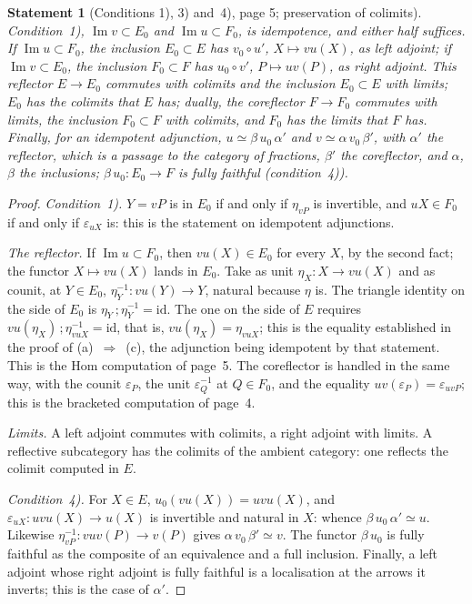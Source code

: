 \documentclass[11pt]{article}
\theoremstyle{plain}
\newtheorem*{enonce}{Statement}
\theoremstyle{definition}
\theoremstyle{remark}
\begin{document}
\begin{enonce}[Conditions 1), 3) and~4), page 5; preservation of colimits]
Condition~1), $\operatorname{Im} v \subset E_0$ and $\operatorname{Im} u \subset F_0$, is idempotence, and either half suffices. If $\operatorname{Im} u \subset F_0$, the inclusion $E_0 \subset E$ has $v_0 \circ u'$, $X \mapsto vu(X)$, as left adjoint; if $\operatorname{Im} v \subset E_0$, the inclusion $F_0 \subset F$ has $u_0 \circ v'$, $P \mapsto uv(P)$, as right adjoint. This reflector $E \to E_0$ commutes with colimits and the inclusion $E_0 \subset E$ with limits; $E_0$ has the colimits that $E$ has; dually, the coreflector $F \to F_0$ commutes with limits, the inclusion $F_0 \subset F$ with colimits, and $F_0$ has the limits that $F$ has. Finally, for an idempotent adjunction, $u \simeq \beta\, u_0\, \alpha'$ and $v \simeq \alpha\, v_0\, \beta'$, with $\alpha'$ the reflector, which is a passage to the category of fractions, $\beta' $ the coreflector, and $\alpha$, $\beta$ the inclusions; $\beta\, u_0 : E_0 \to F$ is fully faithful (condition~4)).
\end{enonce}

\begin{proof}
\emph{Condition~1).} $Y = vP$ is in $E_0$ if and only if $\eta_{vP}$ is invertible, and $uX \in F_0$ if and only if $\varepsilon_{uX}$ is: this is the statement on idempotent adjunctions.

\emph{The reflector.} If $\operatorname{Im} u \subset F_0$, then $vu(X) \in E_0$ for every $X$, by the second fact; the functor $X \mapsto vu(X)$ lands in $E_0$. Take as unit $\eta_X : X \to vu(X)$ and as counit, at $Y \in E_0$, $\eta_Y^{-1} : vu(Y) \to Y$, natural because $\eta$ is. The triangle identity on the side of $E_0$ is $\eta_Y\,;\eta_Y^{-1} = \mathrm{id}$. The one on the side of $E$ requires $vu(\eta_X)\,;\eta_{vuX}^{-1} = \mathrm{id}$, that is, $vu(\eta_X) = \eta_{vuX}$; this is the equality established in the proof of (a)~$\Rightarrow$~(c), the adjunction being idempotent by that statement. This is the Hom computation of page~5. The coreflector is handled in the same way, with the counit $\varepsilon_P$, the unit $\varepsilon_Q^{-1}$ at $Q \in F_0$, and the equality $uv(\varepsilon_P) = \varepsilon_{uvP}$; this is the bracketed computation of page~4.

\emph{Limits.} A left adjoint commutes with colimits, a right adjoint with limits. A reflective subcategory has the colimits of the ambient category: one reflects the colimit computed in $E$.

\emph{Condition~4).} For $X \in E$, $u_0(vu(X)) = uvu(X)$, and $\varepsilon_{uX} : uvu(X) \to u(X)$ is invertible and natural in $X$: whence $\beta\,u_0\,\alpha' \simeq u$. Likewise $\eta_{vP}^{-1} : vuv(P) \to v(P)$ gives $\alpha\,v_0\,\beta' \simeq v$. The functor $\beta\,u_0$ is fully faithful as the composite of an equivalence and a full inclusion. Finally, a left adjoint whose right adjoint is fully faithful is a localisation at the arrows it inverts; this is the case of $\alpha'$.
\end{proof}
\end{document}
